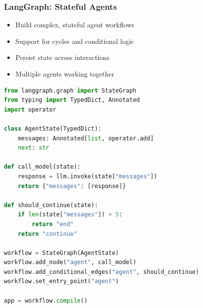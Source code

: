 \begin{frame}[fragile]\frametitle{LangGraph: Stateful Agents}

\begin{itemize}
\item Build complex, stateful agent workflows
\item Support for cycles and conditional logic
\item Persist state across interactions
\item Multiple agents working together
\end{itemize}

\begin{lstlisting}[language=python, basicstyle=\tiny]
from langgraph.graph import StateGraph
from typing import TypedDict, Annotated
import operator

class AgentState(TypedDict):
    messages: Annotated[list, operator.add]
    next: str

def call_model(state):
    response = llm.invoke(state["messages"])
    return {"messages": [response]}

def should_continue(state):
    if len(state["messages"]) > 5:
        return "end"
    return "continue"

workflow = StateGraph(AgentState)
workflow.add_node("agent", call_model)
workflow.add_conditional_edges("agent", should_continue)
workflow.set_entry_point("agent")

app = workflow.compile()
\end{lstlisting}

\end{frame}

